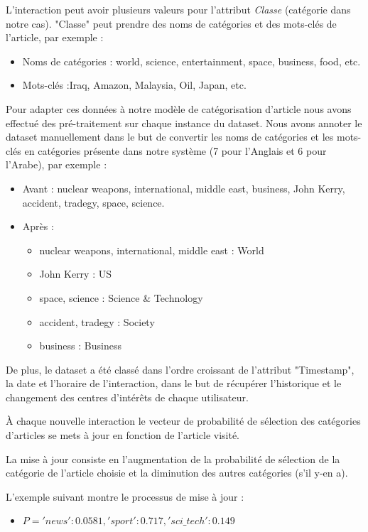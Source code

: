 L'interaction peut avoir plusieurs valeurs pour l'attribut \emph{Classe} (catégorie dans notre cas). "Classe" peut prendre des noms de catégories et des mots-clés de l'article, par exemple :
\begin{itemize}
    \item Noms de catégories : world, science, entertainment, space, business, food, etc.
    \item Mots-clés :Iraq, Amazon, Malaysia, Oil, Japan, etc.\\ 
\end{itemize}
Pour adapter ces données à notre modèle de catégorisation d'article nous avons effectué des pré-traitement sur chaque instance du dataset. Nous avons annoter le dataset manuellement dans le but de convertir les noms de catégories et les mots-clés en catégories présente dans notre système (7 pour l'Anglais et 6 pour l'Arabe), par exemple :
\begin{itemize}
    \item Avant : nuclear weapons, international, middle east, business, John Kerry, accident, tradegy, space, science.
    \item Après : 
    \begin{itemize}
        \item {nuclear weapons, international, middle east} : World
        \item {John Kerry} : US
        \item {space, science} : Science \& Technology
        \item {accident, tradegy} : Society
        \item {business} : Business\\
    \end{itemize}    
\end{itemize}
De plus, le dataset a été classé dans l'ordre croissant de l'attribut "Timestamp", la date et l'horaire de l'interaction, dans le but de récupérer l'historique et le changement des centres d’intérêts de chaque utilisateur. 

À chaque nouvelle interaction le vecteur de probabilité de sélection des catégories d'articles se mets à jour en fonction de l'article visité. 

La mise à jour consiste en l'augmentation de la probabilité de sélection de la catégorie de l'article choisie et la diminution des autres catégories (s'il y-en a). 

L'exemple suivant montre le processus de mise à jour :
\begin{itemize}[label={}]
    \item $P = {'news': 0.0581,'sport': 0.717, 'sci\_tech': 0.149}$\\
\end{itemize}


